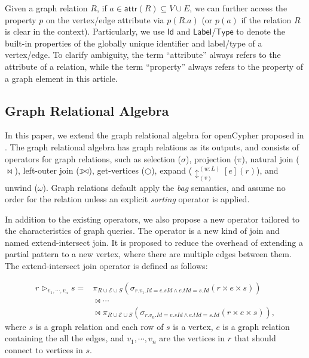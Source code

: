 \documentclass[sigconf, nonacm]{acmart}
\def\ojoin{\setbox0=\hbox{$\bowtie$}%
  \rule[-.02ex]{.25em}{.4pt}\llap{\rule[\ht0]{.25em}{.4pt}}}
\def\leftouterjoin{\mathbin{\ojoin\mkern-5.8mu\bowtie}}
\newcommand{\kw}[1]{{\ensuremath {\mathsf{#1}}}\xspace}
\newcommand{\attr}{\kw{attr}}
\newcommand{\lab}{\kw{Label}}
\newcommand{\type}{\kw{Type}}
\newcommand{\id}{\kw{Id}}
\begin{document}
Given a graph relation $R$, if $a \in \attr(R) \subseteq V \cup E$, we can further access the property $p$ on the vertex/edge attribute via $p(R.a)$ (or $p(a)$ if the relation $R$ is clear in the context). 
Particularly, we use $\id$ and $\lab$/$\type$ to denote the built-in properties of the globally unique identifier and label/type of a vertex/edge. 
To clarify ambiguity, the term ``attribute'' always refers to the attribute of a relation, while the term ``property'' always refers to the property of a graph element in this article.


\subsection{Graph Relational Algebra}

In this paper, we extend the graph relational algebra for openCypher proposed in \cite{}.
The graph relational algebra has graph relations as its outputs, and consists of operators for graph relations, such as selection ($\sigma$), projection ($\pi$), natural join ($\Join$), left-outer join ($\leftouterjoin$), get-vertices ($\bigcirc$), expand ($\updownarrow^{(w:L)}_{(v)}[e](r)$), and unwind ($\omega$).
Graph relations default apply the \emph{bag} semantics, and assume no order for the relation unless an explicit \emph{sorting} operator is applied.


In addition to the existing operators, we also propose a new operator tailored to the characteristics of graph queries.
The operator is a new kind of join and named extend-intersect join.
It is proposed to reduce the overhead of extending a partial pattern to a new vertex, where there are multiple edges between them.
The extend-intersect join operator is defined as follows:

\begin{equation}
    \begin{split}
        r \rhd_{v_1, \cdots, v_n} s = & \pi_{R \cup \mathcal{E} \cup S}(\sigma_{r.v_1.Id = e.sId \land e.tId = s.Id}(r \times e \times s)) \\
        & \Join \cdots \\
        & \Join \pi_{R \cup \mathcal{E} \cup S}(\sigma_{r.v_n.Id = e.sId \land e.tId = s.Id}(r \times e \times s)),
    \end{split}
\end{equation}
where $s$ is a graph relation and each row of $s$ is a vertex,
$e$ is a graph relation containing the all the edges,
and $v_1, \cdots, v_n$ are the vertices in $r$ that should connect to vertices in $s$.
\end{document}
